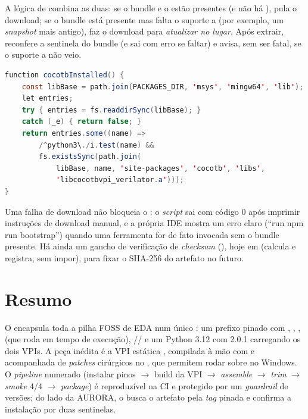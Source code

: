 A lógica de  combina as duas: se o bundle e o  estão
presentes (e não há ), pula o download; se o bundle está presente
mas falta o suporte a  (por exemplo, um \emph{snapshot} mais antigo),
faz o download para \emph{atualizar no lugar}. Após extrair, reconfere a sentinela
do bundle (e sai com erro se faltar) e avisa, sem ser fatal, se o suporte a
 não veio.

\begin{lstlisting}[language=Java,caption={Detecção do cocotb via varredura de python3.* (download-toolchain.js).}]
function cocotbInstalled() {
    const libBase = path.join(PACKAGES_DIR, 'msys', 'mingw64', 'lib');
    let entries;
    try { entries = fs.readdirSync(libBase); }
    catch (_e) { return false; }
    return entries.some((name) =>
        /^python3\./i.test(name) &&
        fs.existsSync(path.join(
            libBase, name, 'site-packages', 'cocotb', 'libs',
            'libcocotbvpi_verilator.a')));
}
\end{lstlisting}

\begin{nota}
Uma falha de download não bloqueia o : o \emph{script} sai com
código 0 após imprimir instruções de download manual, e a própria IDE mostra um
erro claro (\enquote{run npm run bootstrap}) quando uma ferramenta for de fato
invocada sem o bundle presente. Há ainda um gancho de verificação de
\emph{checksum} (), hoje em  (calcula e registra,
sem impor), para fixar o SHA-256 do artefato no futuro.
\end{nota}

\section{Resumo}

O  encapsula toda a pilha FOSS de EDA num único
: um prefixo  pinado com ,
, ,  (que roda em tempo de execução),
// e um Python 3.12 com  2.0.1
carregando os dois VPIs. A peça inédita é a VPI estática
, compilada à mão com  e
acompanhada de \emph{patches} cirúrgicos no , que
permitem rodar  sobre  no Windows. O \emph{pipeline}
numerado (instalar pinos $\rightarrow$ build da VPI $\rightarrow$ \emph{assemble}
$\rightarrow$ \emph{trim} $\rightarrow$ \emph{smoke} 4/4 $\rightarrow$ \emph{package})
é reproduzível na CI e protegido por um \emph{guardrail} de versões; do lado da
AURORA, o  busca o artefato pela \emph{tag} pinada e
confirma a instalação por duas sentinelas.
